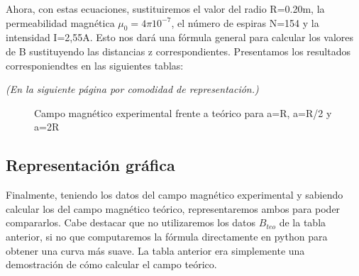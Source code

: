 \documentclass[12pt, a4paper, titlepage]{article}
\begin{document}
  Ahora, con estas ecuaciones, sustituiremos el valor del radio R=0.20m, la permeabilidad magnética $\mu_0 = 4 \pi 10^{-7}$, el número de espiras N=154 y la intensidad I=2,55A. Esto nos dará una fórmula general para calcular los valores de B sustituyendo las distancias z correspondientes. Presentamos los resultados corresponiendtes en las siguientes tablas:

  \textit{(En la siguiente página por comodidad de representación.)}

  \begin{figure}[H]
    \begin{table}[H]
      \centering
       \quad
       \quad
       \quad
       \quad
    \end{table}
    \caption{Campo magnético experimental frente a teórico para a=R, a=R/2 y a=2R}
  \end{figure}

  \subsection{Representación gráfica}

  Finalmente, teniendo los datos del campo magnético experimental y sabiendo calcular los del campo magnético teórico, representaremos ambos para poder compararlos. Cabe destacar que no utilizaremos los datos $B_{teo}$ de la tabla anterior, si no que computaremos la fórmula directamente en python para obtener una curva más suave. La tabla anterior era simplemente una demostración de cómo calcular el campo teórico.
\end{document}
